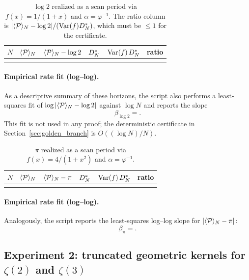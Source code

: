 \begin{table}[t]
\centering
\begin{tabular}{@{}rrrrrr@{}}
\toprule
$N$ & $\langle \mathcal{P} \rangle_N$ & $\langle \mathcal{P} \rangle_N-\log 2$ & $D_N^\ast$ & $\mathrm{Var}(f)\,D_N^\ast$ & ratio \\
\midrule

\\
\bottomrule
\end{tabular}
\caption{$\log 2$ realized as a scan period via $f(x)=1/(1+x)$ and $\alpha=\varphi^{-1}$. The ratio column is $|\langle \mathcal{P} \rangle_N-\log 2|/(\mathrm{Var}(f)D_N^\ast)$, which must be $\le 1$ for the certificate.}
\label{tab:log2_scan}
\end{table}

\paragraph{Empirical rate fit (log--log).}
As a descriptive summary of these horizons, the script also performs a least-squares fit of $\log|\langle \mathcal{P} \rangle_N-\log 2|$ against $\log N$ and reports the slope
\[
\beta_{\log 2}=.
\]
This fit is not used in any proof; the deterministic certificate in Section~\ref{sec:golden_branch} is $O((\log N)/N)$.

\begin{table}[t]
\centering
\begin{tabular}{@{}rrrrrr@{}}
\toprule
$N$ & $\langle \mathcal{P} \rangle_N$ & $\langle \mathcal{P} \rangle_N-\pi$ & $D_N^\ast$ & $\mathrm{Var}(f)\,D_N^\ast$ & ratio \\
\midrule

\\
\bottomrule
\end{tabular}
\caption{$\pi$ realized as a scan period via $f(x)=4/(1+x^2)$ and $\alpha=\varphi^{-1}$.}
\label{tab:pi_scan}
\end{table}

\paragraph{Empirical rate fit (log--log).}
Analogously, the script reports the least-squares log--log slope for $|\langle \mathcal{P} \rangle_N-\pi|$:
\[
\beta_{\pi}=.
\]

\subsection{Experiment 2: truncated geometric kernels for \texorpdfstring{$\zeta(2)$}{zeta(2)} and \texorpdfstring{$\zeta(3)$}{zeta(3)}}
\label{sec:exp_zeta}

